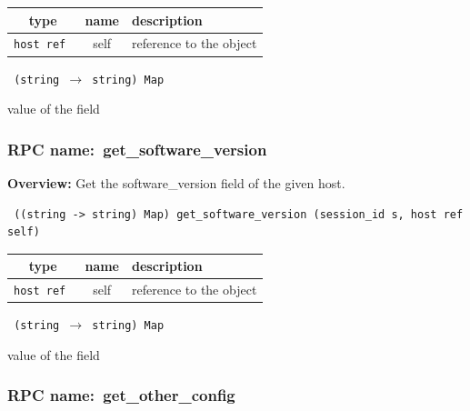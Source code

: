  
\vspace{0.3cm}
\begin{tabular}{|c|c|p{7cm}|}
 \hline
{\bf type} & {\bf name} & {\bf description} \\ \hline
{\tt host ref } & self & reference to the object \\ \hline 

\end{tabular}

\vspace{0.3cm}

{\tt 
(string $\rightarrow$ string) Map
}


value of the field
\vspace{0.3cm}
\vspace{0.3cm}
\vspace{0.3cm}
\subsubsection{RPC name:~get\_software\_version}

{\bf Overview:} 
Get the software\_version field of the given host.

\begin{verbatim} ((string -> string) Map) get_software_version (session_id s, host ref self)\end{verbatim}



 
\vspace{0.3cm}
\begin{tabular}{|c|c|p{7cm}|}
 \hline
{\bf type} & {\bf name} & {\bf description} \\ \hline
{\tt host ref } & self & reference to the object \\ \hline 

\end{tabular}

\vspace{0.3cm}

{\tt 
(string $\rightarrow$ string) Map
}


value of the field
\vspace{0.3cm}
\vspace{0.3cm}
\vspace{0.3cm}
\subsubsection{RPC name:~get\_other\_config}

